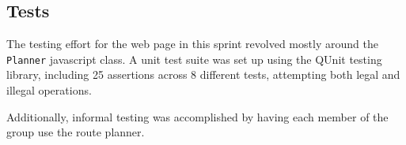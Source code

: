 \subsection{Tests}

The testing effort for the web page in this sprint revolved mostly around the \texttt{Planner} javascript class. A unit test suite was set up using the QUnit testing library\cite{qunit}, including 25 assertions across 8 different tests, attempting both legal and illegal operations.

Additionally, informal testing was accomplished by having each member of the group use the route planner.
